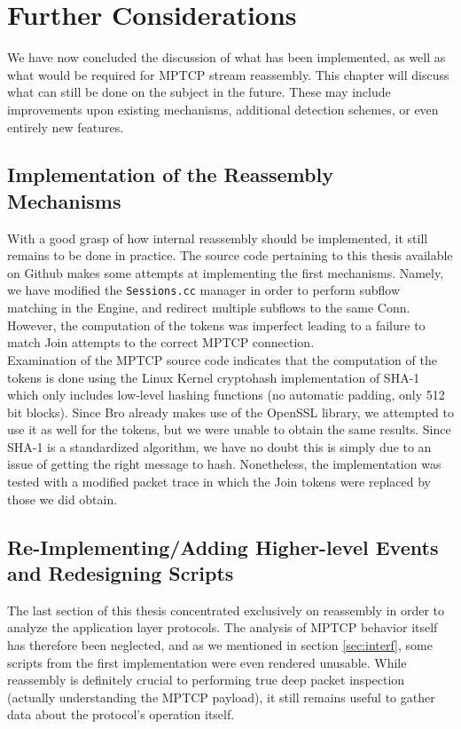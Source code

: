 


\chapter{Further Considerations} \label{chap:further}
We have now concluded the discussion of what has been implemented, as well as what would be required for MPTCP stream reassembly. This chapter will discuss what can still be done on the subject in the future. These may include improvements upon existing mechanisms, additional detection schemes, or even entirely new features.

\section{Implementation of the Reassembly Mechanisms}
With a good grasp of how internal reassembly should be implemented, it still remains to be done in practice. The source code pertaining to this thesis available on Github makes some attempts at implementing the first mechanisms. Namely, we have modified the \texttt{Sessions.cc} manager in order to perform subflow matching in the Engine, and redirect multiple subflows to the same Conn. However, the computation of the tokens was imperfect leading to a failure to match Join attempts to the correct MPTCP connection. \\ 

Examination of the MPTCP source code indicates that the computation of the tokens is done using the Linux Kernel cryptohash implementation of SHA-1 which only includes low-level hashing functions (no automatic padding, only 512 bit blocks). Since Bro already makes use of the OpenSSL library, we attempted to use it as well for the tokens, but we were unable to obtain the same results. Since SHA-1 is a standardized algorithm, we have no doubt this is simply due to an issue of getting the right message to hash. Nonetheless, the implementation was tested with a modified packet trace in which the Join tokens were replaced by those we did obtain.

\section{Re-Implementing/Adding Higher-level Events and Redesigning Scripts}
The last section of this thesis concentrated exclusively on reassembly in order to analyze the application layer protocols. The analysis of MPTCP behavior itself has therefore been neglected, and as we mentioned in section \ref{sec:interf}, some scripts from the first implementation were even rendered unusable. While reassembly is definitely crucial to performing true deep packet inspection (actually understanding the MPTCP payload), it still remains useful to gather data about the protocol's operation itself. \\

